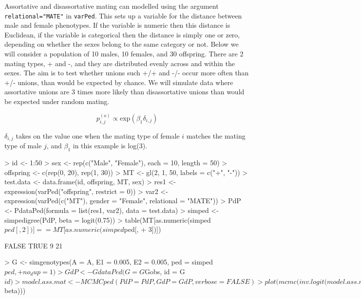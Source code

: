 \documentclass{article}
\begin{document}
Assortative and disassortative mating can modelled using the argument \texttt{relational="MATE"} in \texttt{varPed}. This sets up a variable for the distance between male and female phenotypes.  If the variable is numeric then this distance is Euclidean, if the variable is categorical then the distance is simply one or zero, depending on whether the sexes belong to the same category or not.  Below we will consider a population of 10 males, 10 females, and 30 offspring.  There are 2 mating types, + and -, and they are distributed evenly across and within the sexes.   The aim is to test whether unions such +/+ and -/- occur more often than +/- unions, than would be expected by chance.  We will simulate data where assortative unions are 3 times more likely than disassortative unions than would be expected under random mating.  

\begin{equation}
p^{(o)}_{i,j} \propto \textrm{exp}(\beta_{1}\delta_{i,j})
\label{AM-eq}
\end{equation}

$\delta_{i,j}$ takes on the value one when the mating type of female $i$ matches the mating type of male $j$, and $\beta_{1}$ in this example is log(3).

\begin{Schunk}
\begin{Sinput}
> id <- 1:50
> sex <- rep(c("Male", "Female"), each = 10, length = 50)
> offspring <- c(rep(0, 20), rep(1, 30))
> MT <- gl(2, 1, 50, labels = c("+", "-"))
> test.data <- data.frame(id, offspring, MT, sex)
> res1 <- expression(varPed("offspring", restrict = 0))
> var2 <- expression(varPed(c("MT"), gender = "Female", relational = "MATE"))
> PdP <- PdataPed(formula = list(res1, var2), data = test.data)
> simped <- simpedigree(PdP, beta = logit(0.75))
> table(MT[as.numeric(simped$ped[, 2])] == MT[as.numeric(simped$ped[, 
+     3])])
\end{Sinput}
\begin{Soutput}
FALSE  TRUE 
    9    21 
\end{Soutput}
\begin{Sinput}
> G <- simgenotypes(A = A, E1 = 0.005, E2 = 0.005, ped = simped$ped, 
+     no_dup = 1)
> GdP <- GdataPed(G = G$Gobs, id = G$id)
> model.ass.mat <- MCMCped(PdP = PdP, GdP = GdP, verbose = FALSE)
> plot(mcmc(inv.logit(model.ass.mat$beta)))
\end{Sinput}
\end{Schunk}
\end{document}
